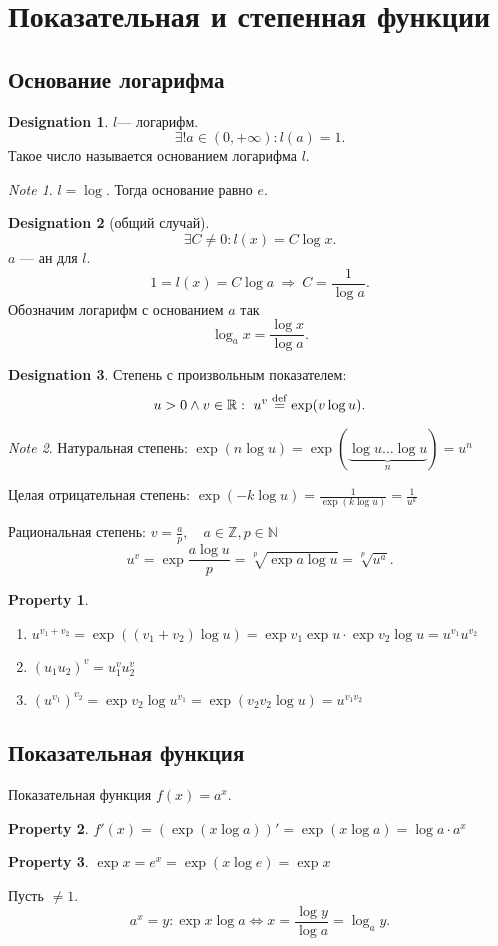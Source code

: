 \documentclass[11pt]{book}
\newcommand{\Z}{\mathbb{Z}}
\newcommand{\N}{\mathbb{N}}
\newcommand{\R}{\mathbb{R}}
\def\mydef{\mathrel{\stackrel{\rm def}=}}
\theoremstyle{definition}
\theoremstyle{plain}
\theoremstyle{plain}
\newtheorem*{prop}{Property}
\theoremstyle{definition}
\newtheorem*{name}{Designation}
\theoremstyle{remark}
\newtheorem*{note}{Note}
\begin{document}
\section{Показательная и степенная функции}
\subsection{Основание логарифма}
\begin{name}
    $ l $--- логарифм.
    \[
	\exists ! a \in  (0, +\infty): l(a) = 1
    .\]  Такое число называется основанием логарифма $ l$.
\end{name}
\begin{note}
    $ l = \log$. Тогда основание равно $ e$.
\end{note}
\begin{name}[общий случай]
    \[
	\exists C \ne 0 : l(x) = C \log x
    .\]
    $ a$ --- ан для $ l$.
    \[
	1 = l(x) = C \log a ~ \Longrightarrow  ~ C= \frac{1}{\log a}
    .\]
    Обозначим логарифм с основанием $ a$ так \[
	\log_a x = \frac{\log x}{\log a}
    .\]
\end{name}
\begin{name}
    Степень с произвольным показателем:
    \[
	u>0 \wedge v \in  \R: ~ u^{v} \mydef \exp(v \log u)
    .\]
\end{name}
\begin{note}
    Натуральная степень:
    $ \exp( n \log u) = \exp(\underbrace{\log u \ldots \log u}_{n}) = u ^{ n}$

    Целая отрицательная степень: $ \exp( - k \log u) = \frac{1}{\exp(k \log u)} = \frac{1}{u^{k}}$

    Рациональная степень: $ v = \frac{a}{p}, \quad a \in  \Z, p \in  \N$
    \[
	u ^{ v} = \exp\frac{a \log u}{p} = \sqrt[p]{\exp a \log u} = \sqrt[p]{u^{a}}
    .\]
\end{note}
\begin{prop}
    $ $
    \begin{enumerate}
	\item $ u^{v_1 + v_2} = \exp ((v_1+v_2) \log u) = \exp v_1 \exp u \cdot  \exp v_2 \log u = u ^{v_1} u ^{v_2}$
	\item $ (u_1 u_2)^{v} = u_1^{v} u_2^{v} $
	\item $ {(u^{v_1})}^{v_2} = \exp v_2 \log u ^{ v_1} = \exp (v_2 v_2 \log u) = u ^{ v_1 v_2}$
    \end{enumerate}
\end{prop}
\subsection{Показательная функция}
\begin{defn}
    Показательная функция $ f(x) = a^{x}$.
\end{defn}
\begin{prop}
    $ f'(x) = (\exp (x \log a))' = \exp(x \log a) = \log a \cdot  a^{x}$
\end{prop}
\begin{prop}
    $ \exp x = e^{ x} = \exp(x \log e) = \exp x$
\end{prop}
\begin{defn}
    Пусть $  \ne 1$.  \[
	a^{x} = y: \exp x \log a \Leftrightarrow  x = \frac{\log y}{\log a} = \log_a y
    .\]
\end{defn}
\end{document}
